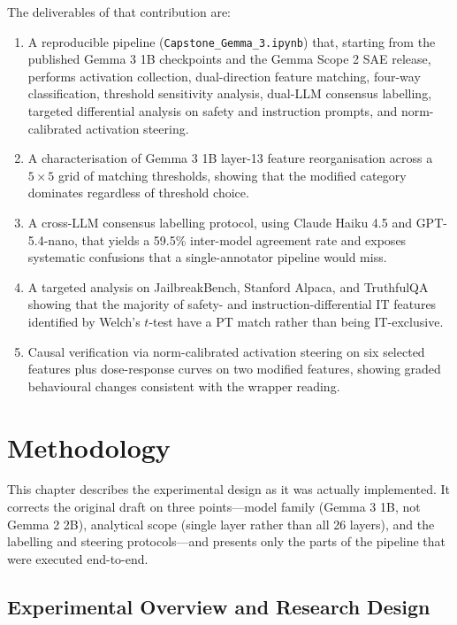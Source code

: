 The deliverables of that contribution are:
\begin{enumerate}
    \item A reproducible pipeline (\texttt{Capstone\_Gemma\_3.ipynb}) that, starting from the published Gemma 3 1B checkpoints and the Gemma Scope 2 SAE release, performs activation collection, dual-direction feature matching, four-way classification, threshold sensitivity analysis, dual-LLM consensus labelling, targeted differential analysis on safety and instruction prompts, and norm-calibrated activation steering.
    \item A characterisation of Gemma 3 1B layer-13 feature reorganisation across a $5 \times 5$ grid of matching thresholds, showing that the modified category dominates regardless of threshold choice.
    \item A cross-LLM consensus labelling protocol, using Claude Haiku 4.5 and GPT-5.4-nano, that yields a 59.5\% inter-model agreement rate and exposes systematic confusions that a single-annotator pipeline would miss.
    \item A targeted analysis on JailbreakBench, Stanford Alpaca, and TruthfulQA showing that the majority of safety- and instruction-differential IT features identified by Welch's $t$-test have a PT match rather than being IT-exclusive.
    \item Causal verification via norm-calibrated activation steering on six selected features plus dose-response curves on two modified features, showing graded behavioural changes consistent with the wrapper reading.
\end{enumerate}

\section{Methodology}
\label{sec:methodology}

This chapter describes the experimental design as it was actually implemented. It corrects the original draft on three points---model family (Gemma 3 1B, not Gemma 2 2B), analytical scope (single layer rather than all 26 layers), and the labelling and steering protocols---and presents only the parts of the pipeline that were executed end-to-end.

\subsection{Experimental Overview and Research Design}
\label{subsec:experimental-overview}

